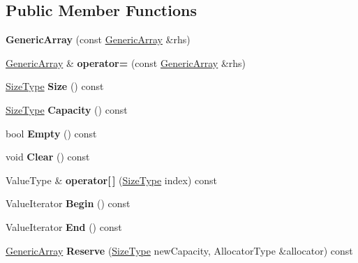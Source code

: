 \subsection*{Public Member Functions}
\begin{DoxyCompactItemize}
\item 
\mbox{\label{a02076_aa589d897a194b349d5053391a6f1491d}} 
{\bfseries Generic\+Array} (const \hyperlink{a02076}{Generic\+Array} \&rhs)
\item 
\mbox{\label{a02076_addbff152092d0998b2c550bd575f4b83}} 
\hyperlink{a02076}{Generic\+Array} \& {\bfseries operator=} (const \hyperlink{a02076}{Generic\+Array} \&rhs)
\item 
\mbox{\label{a02076_a62d5b7f423edc2141cd4524c7dfd138b}} 
\hyperlink{a00560_a5ed6e6e67250fadbd041127e6386dcb5}{Size\+Type} {\bfseries Size} () const
\item 
\mbox{\label{a02076_ab385434ab7a99de7a0a17e5ee7e09d7f}} 
\hyperlink{a00560_a5ed6e6e67250fadbd041127e6386dcb5}{Size\+Type} {\bfseries Capacity} () const
\item 
\mbox{\label{a02076_af09e3aaeaeeb5fd825d79cc6663dfcf5}} 
bool {\bfseries Empty} () const
\item 
\mbox{\label{a02076_a5e6c158ff76ab8a8ed568fa486e63c80}} 
void {\bfseries Clear} () const
\item 
\mbox{\label{a02076_aa185d997e7787e9b4f624d5de592b886}} 
Value\+Type \& {\bfseries operator\mbox{[}$\,$\mbox{]}} (\hyperlink{a00560_a5ed6e6e67250fadbd041127e6386dcb5}{Size\+Type} index) const
\item 
\mbox{\label{a02076_a3efaa020b29ceed9c1a03465676a32a7}} 
Value\+Iterator {\bfseries Begin} () const
\item 
\mbox{\label{a02076_a396f83d328f4879225106ea14b1dca84}} 
Value\+Iterator {\bfseries End} () const
\item 
\mbox{\label{a02076_a7c74901e8e2174fe4661f4848995f355}} 
\hyperlink{a02076}{Generic\+Array} {\bfseries Reserve} (\hyperlink{a00560_a5ed6e6e67250fadbd041127e6386dcb5}{Size\+Type} new\+Capacity, Allocator\+Type \&allocator) const

\end{DoxyCompactItemize}
